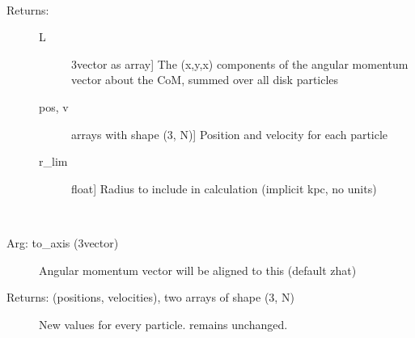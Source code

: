 \documentclass[letterpaper,10pt,english]{sphinxmanual}
\begin{document}
\begin{fulllineitems}
\begin{fulllineitems}
\begin{description}
\end{description}

\end{fulllineitems}


\begin{fulllineitems}
\label{\detokenize{centerofmass:galaxy.centerofmass.CenterOfMass.angular_momentum}}~\begin{description}
\item[{Returns: }] \leavevmode\begin{description}
\item[{L}] \leavevmode{[}3\sphinxhyphen{}vector as array{]}
The (x,y,x) components of the angular momentum vector about the CoM,
summed over all disk particles

\item[{pos, v}] \leavevmode{[}arrays with shape (3, N){]}
Position and velocity for each particle

\item[{r\_lim}] \leavevmode{[}float{]}
Radius to include in calculation (implicit kpc, no units)

\end{description}

\end{description}

\end{fulllineitems}


\begin{fulllineitems}
\label{\detokenize{centerofmass:galaxy.centerofmass.CenterOfMass.rotate_frame}}~\begin{description}
\item[{Arg: to\_axis (3\sphinxhyphen{}vector)}] \leavevmode
Angular momentum vector will be aligned to this (default z\sphinxhyphen{}hat)

\item[{Returns: (positions, velocities), two arrays of shape (3, N)}] \leavevmode
New values for every particle.  remains unchanged.


\end{description}
\end{fulllineitems}
\end{fulllineitems}
\end{document}

